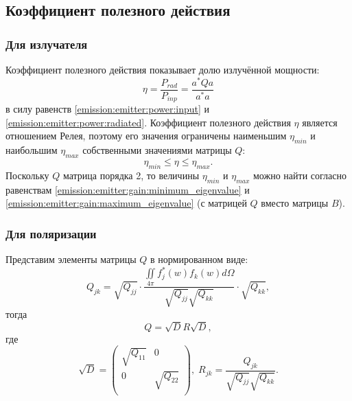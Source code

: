 \subsection{Коэффициент полезного действия}

\subsubsection{Для излучателя}

Коэффициент полезного действия показывает долю излучённой мощности:
\[
    \eta
    = \frac{P_{rad}}{P_{inp}}
    = \frac{a^* Q a}{a^* a}
\]
в силу равенств \eqref{emission:emitter:power:input} и \eqref{emission:emitter:power:radiated}. Коэффициент полезного действия $\eta$ является отношением Релея,
поэтому его значения ограничены наименьшим $\eta_{min}$ и наибольшим $\eta_{max}$ собственными значениями матрицы $Q$:
\[
    \eta_{min} \le \eta \le \eta_{max} .
\]
Поскольку $Q$ матрица порядка 2, то величины $\eta_{min}$ и $\eta_{max}$ можно найти согласно равенствам \eqref{emission:emitter:gain:minimum_eigenvalue} и
\eqref{emission:emitter:gain:maximum_eigenvalue} (с матрицей $Q$ вместо матрицы $B$).

\subsubsection{Для поляризации}

Представим элементы матрицы $Q$ в нормированном виде:
\[
    Q_{jk}
    =
    \sqrt{Q_{jj}}
    \cdot
    \frac{\iint \limits_{4 \pi} f_j^*(w) f_k(w) d \Omega}{\sqrt{Q_{jj}} \sqrt{Q_{kk}}}
    \cdot
    \sqrt{Q_{kk}} ,
\]
тогда
\[
    Q = \sqrt{D} R \sqrt{D} ,
\]
где
\[
    \sqrt{D}
    = \begin{pmatrix}
          \sqrt{Q_{11}} & 0             \\
          0             & \sqrt{Q_{22}} \\
    \end{pmatrix} ,
    \;
    R_{jk} = \frac{Q_{jk}}{\sqrt{Q_{jj}} \sqrt{Q_{kk}}} .
\]

